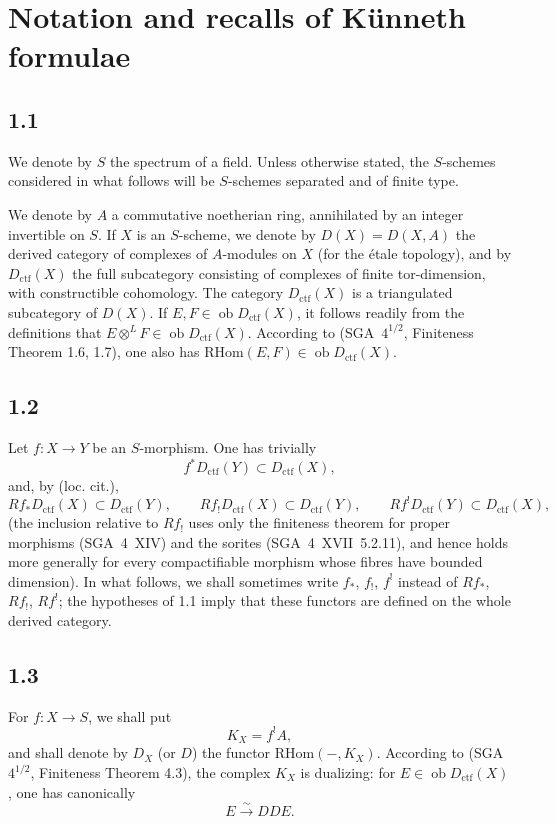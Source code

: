 \documentclass[11pt]{article}
\newcommand{\ob}{\operatorname{ob}}
\providecommand{\RHom}{\mathrm{RHom}}
\providecommand{\ctf}{\mathrm{ctf}}
\providecommand{\RHom}{\mathrm{RHom}}
\providecommand{\ob}{\operatorname{ob}}
\providecommand{\RHom}{\mathrm R\mathcal{H}om}
\begin{document}
\section{Notation and recalls of Künneth formulae}

\subsection*{1.1}
We denote by $S$ the spectrum of a field. Unless otherwise stated, the $S$-schemes considered in what follows will be $S$-schemes separated and of finite type.

We denote by $A$ a commutative noetherian ring, annihilated by an integer invertible on $S$. If $X$ is an $S$-scheme, we denote by $D(X)=D(X,A)$ the derived category of complexes of $A$-modules on $X$ (for the étale topology), and by $D_{\ctf}(X)$ the full subcategory consisting of complexes of finite tor-dimension, with constructible cohomology. The category $D_{\ctf}(X)$ is a triangulated subcategory of $D(X)$. If $E,F\in\ob D_{\ctf}(X)$, it follows readily from the definitions that $E\otimes^L F\in\ob D_{\ctf}(X)$. According to (SGA~$4^{1/2}$, Finiteness Theorem 1.6, 1.7), one also has $\RHom(E,F)\in\ob D_{\ctf}(X)$.

\subsection*{1.2}
Let $f:X\to Y$ be an $S$-morphism. One has trivially
\[
f^{*}D_{\ctf}(Y) \subset D_{\ctf}(X),
\]
and, by (loc. cit.),
\[
Rf_{*}D_{\ctf}(X) \subset D_{\ctf}(Y),\qquad
Rf_{!}D_{\ctf}(X) \subset D_{\ctf}(Y),\qquad
Rf^{!}D_{\ctf}(Y) \subset D_{\ctf}(X),
\]
(the inclusion relative to $Rf_{!}$ uses only the finiteness theorem for proper morphisms (SGA~4~XIV) and the sorites (SGA~4~XVII~5.2.11), and hence holds more generally for every compactifiable morphism whose fibres have bounded dimension). In what follows, we shall sometimes write $f_{*}$, $f_{!}$, $f^{!}$ instead of $Rf_{*}$, $Rf_{!}$, $Rf^{!}$; the hypotheses of 1.1 imply that these functors are defined on the whole derived category.

\subsection*{1.3}
For $f:X\to S$, we shall put
\[
K_X=f^{!}A,
\]
and shall denote by $D_X$ (or $D$) the functor $\RHom(-,K_X)$. According to (SGA~$4^{1/2}$, Finiteness Theorem 4.3), the complex $K_X$ is dualizing: for $E\in\ob D_{\ctf}(X)$, one has canonically
\[
E \xrightarrow{\sim} DDE.
\]
\end{document}
